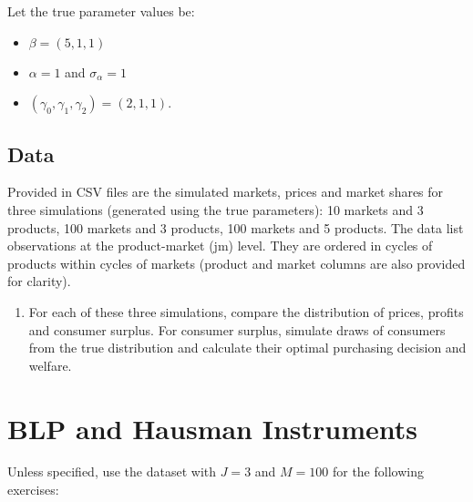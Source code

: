 \documentclass[12pt ]{article}
\begin{document}
Let the true parameter values be:
\begin{itemize}
\item $\beta=(5,1,1)$
\item $\alpha=1$ and $\sigma_{\alpha}=1$
\item $(\gamma_0,\gamma_1, \gamma_2) = (2,1,1)$.
\end{itemize}

\subsection{Data}

Provided in CSV files are the simulated markets, prices and market shares for three simulations (generated using the true parameters): 10 markets and 3 products, 100 markets and 3 products, 100 markets and 5 products. The data list observations at the product-market (jm) level. They are ordered in cycles of products within cycles of markets (product and market columns are also provided for clarity).

\begin{enumerate}[1.]
\item For each of these three simulations, compare the distribution of prices, profits and consumer surplus.  For consumer surplus, simulate draws of consumers from the true distribution and calculate their optimal purchasing decision and welfare. 
\end{enumerate}

\section{BLP and Hausman Instruments}

Unless specified, use the dataset with $J=3$ and $M=100$ for the
following exercises:
\end{document}
